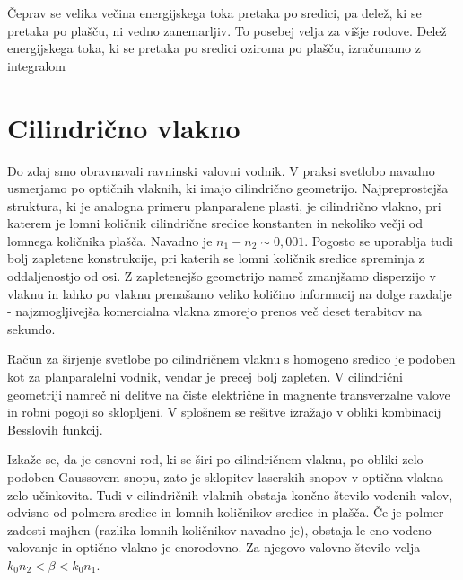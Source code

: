 Čeprav se velika večina energijskega toka pretaka po sredici, pa delež, ki se 
pretaka po plašču, ni vedno zanemarljiv. To posebej velja za višje rodove. 
Delež energijskega toka, ki se pretaka po sredici oziroma po plašču, izračunamo
z integralom

\section{Cilindrično vlakno}
\label{chap:Cilinder}
Do zdaj smo obravnavali ravninski valovni vodnik. V praksi svetlobo
navadno usmerjamo po optičnih vlaknih, ki imajo cilindrično geometrijo.
Najpreprostejša struktura, ki je analogna primeru planparalene
plasti, je cilindrično vlakno, pri katerem je lomni količnik cilindrične
sredice konstanten in nekoliko večji od lomnega količnika plašča. Navadno je 
$n_1 - n_2 \sim 0,001$. Pogosto se uporablja
tudi bolj zapletene konstrukcije, pri katerih se lomni količnik sredice spreminja z
oddaljenostjo od osi. Z zapletenejšo geometrijo nameč zmanjšamo disperzijo v vlaknu in lahko 
po vlaknu prenašamo veliko količino informacij na dolge razdalje - najzmogljivejša komercialna vlakna
zmorejo prenos več deset terabitov na sekundo. 

Račun za širjenje svetlobe po cilindričnem vlaknu s homogeno sredico
je podoben kot za planparalelni vodnik, vendar je precej bolj
zapleten. V cilindrični geometriji namreč ni delitve na čiste električne in 
magnente transverzalne valove in robni pogoji so sklopljeni. V splošnem se rešitve izražajo 
v obliki kombinacij Besslovih funkcij. 

Izkaže se, da je osnovni rod, ki se širi po cilindričnem vlaknu, po obliki zelo podoben
Gaussovem snopu, zato je sklopitev laserskih snopov v optična vlakna zelo učinkovita.
Tudi v cilindričnih vlaknih obstaja končno število vodenih valov, odvisno od polmera sredice in
lomnih količnikov sredice in plašča. Če je polmer zadosti majhen (razlika lomnih
količnikov navadno je), obstaja le eno vodeno valovanje in optično vlakno je enorodovno. 
Za njegovo valovno število velja $k_{0} n_{2}<\beta<k_{0} n_{1}$. 


